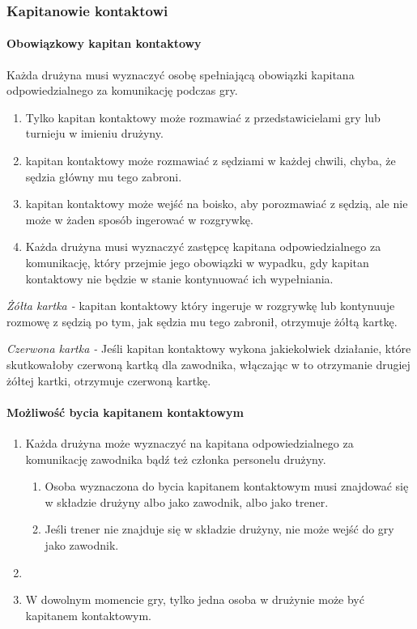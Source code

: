 \documentclass[12pt]{article}
\begin{document}
\subsubsection{Kapitanowie kontaktowi}

\paragraph{Obowiązkowy kapitan kontaktowy}
Każda drużyna musi wyznaczyć
osobę spełniającą obowiązki kapitana odpowiedzialnego za komunikację
podczas gry.

\begin{enumerate}
	\item Tylko kapitan kontaktowy może rozmawiać z przedstawicielami gry lub
	      turnieju w imieniu drużyny.

	\item kapitan kontaktowy może rozmawiać z sędziami w każdej chwili, chyba,
	      że sędzia główny mu tego zabroni.

	\item kapitan kontaktowy może wejść na boisko, aby porozmawiać z sędzią,
	      ale nie może w żaden sposób ingerować w rozgrywkę.

	\item Każda drużyna musi wyznaczyć zastępcę kapitana odpowiedzialnego za
	      komunikację, który przejmie jego obowiązki w wypadku, gdy kapitan
	      kontaktowy nie będzie w stanie kontynuować ich wypełniania.
\end{enumerate}

\emph{Żółta kartka -} kapitan kontaktowy który ingeruje w rozgrywkę lub
kontynuuje rozmowę z sędzią po tym, jak sędzia mu tego zabronił,
otrzymuje żółtą kartkę.

\emph{Czerwona kartka -} Jeśli kapitan kontaktowy wykona jakiekolwiek
działanie, które skutkowałoby czerwoną kartką dla zawodnika, włączając w
to otrzymanie drugiej żółtej kartki, otrzymuje czerwoną kartkę.

\paragraph{Możliwość bycia kapitanem kontaktowym}

\begin{enumerate}
	\item
	      Każda drużyna może wyznaczyć na kapitana odpowiedzialnego za
	      komunikację zawodnika bądź też członka personelu drużyny.

	      \begin{enumerate}
		      \item
		            Osoba wyznaczona do bycia kapitanem kontaktowym musi znajdować się w
		            składzie drużyny albo jako zawodnik, albo jako trener.
		      \item
		            Jeśli trener nie znajduje się w składzie drużyny, nie może wejść do
		            gry jako zawodnik.
	      \end{enumerate}
	\item
	\item W dowolnym momencie gry, tylko jedna osoba w drużynie może być
	      kapitanem kontaktowym.
\end{enumerate}
\end{document}
